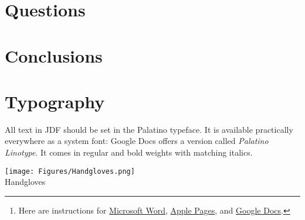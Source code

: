 \documentclass[
	letterpaper, %
]{jdf}
\begin{document}
\section{Questions}

\section{Conclusions}









\begin{abstract}
	Welcome to Joyner Document Format (JDF) v2.2! JDF is primarily intended to standardize page lengths while ensuring readability. 
	Note that you are required to use JDF for all written assignments, but we will not perform explicit formatting checks. 
	So, while improper formatting may be subject to penalties, you should not worry too much about whether your submission conforms to 
	every minute detail; the most important elements are margins, font, font sizes, and line spacing. Just make a copy of one of the provided templates 
	and replace its contents with your own, using the built-in paragraph styles.\footnote{Here are instructions for 
	\href{https://support.office.com/en-us/article/Video-Using-Styles-in-Word-9db4c0f4-2754-4294-9758-c14a0abd8cfa}{Microsoft Word}, 
	\href{https://support.apple.com/guide/pages/intro-to-paragraph-styles-tanaa39b0aa3/mac}{Apple Pages}, and 
	\href{https://www.bazroberts.com/2016/04/19/google-docs-paragraph-styles-headings/}{Google Docs}.} If you do so, you do not need to verify that the style was followed.
\end{abstract}

\section{Typography}
All text in JDF should be set in the Palatino typeface. It is available practically everywhere as a system font: Google Docs offers a version 
called \emph{Palatino Linotype}. It comes in regular and bold weights with matching italics.

\begin{jdffigure}
\texttt{[image: Figures/Handgloves.png]} \\
{\huge Handgloves}%
\label{fig:Palatino}%
\end{jdffigure}
\end{document}
